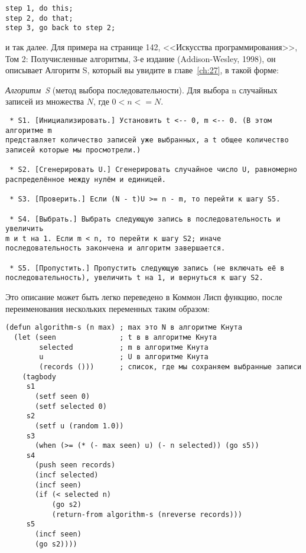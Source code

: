 \begin{lstlisting}[style=lisprepl]
step 1, do this; 
step 2, do that; 
step 3, go back to step 2;
\end{lstlisting}

и так далее. Для примера на странице 142, <<Искусства программирования>>, Том 2:
Получисленные алгоритмы, 3-е издание (Addison-Wesley, 1998), он описывает Алгоритм S,
который вы увидите в главе~\ref{ch:27}, в такой форме:

\textit{Алгоритм~S} (метод выбора последовательности). Для выбора n случайных записей из
множества $N$, где $0 < n <= N$.

\begin{lstlisting}
 * S1. [Инициализировать.] Установить t <-- 0, m <-- 0. (В этом алгоритме m 
представляет количество записей уже выбранных, а t общее количество 
записей которые мы просмотрели.)

 * S2. [Сгенерировать U.] Сгенерировать случайное число U, равномерно 
распределённое между нулём и единицей.

 * S3. [Проверить.] Если (N - t)U >= n - m, то перейти к шагу S5.

 * S4. [Выбрать.] Выбрать следующую запись в последовательность и увеличить
m и t на 1. Если m < n, то перейти к шагу S2; иначе 
последовательность закончена и алгоритм завершается.

 * S5. [Пропустить.] Пропустить следующую запись (не включать её в 
последовательность), увеличить t на 1, и вернуться к шагу S2.
\end{lstlisting}

Это описание может быть легко переведено в Коммон Лисп функцию, после переименования
нескольких переменных таким образом:

\begin{lstlisting}
(defun algorithm-s (n max) ; max это N в алгоритме Кнута
  (let (seen               ; t в в алгоритме Кнута
        selected           ; m в алгоритме Кнута
        u                  ; U в алгоритме Кнута
        (records ()))      ; список, где мы сохраняем выбранные записи
    (tagbody
     s1
       (setf seen 0)
       (setf selected 0)
     s2
       (setf u (random 1.0))
     s3
       (when (>= (* (- max seen) u) (- n selected)) (go s5))
     s4
       (push seen records)
       (incf selected)
       (incf seen)
       (if (< selected n)
           (go s2)
           (return-from algorithm-s (nreverse records)))
     s5
       (incf seen)
       (go s2))))
\end{lstlisting}


